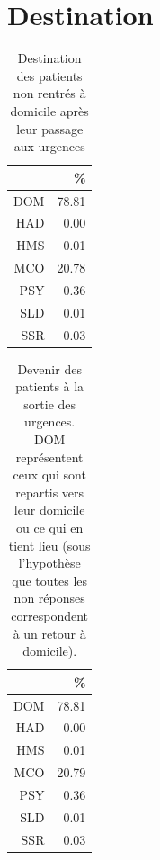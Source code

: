 \documentclass[12pt,english,french,twoside]{report}\usepackage[]{graphicx}\usepackage[]{color}
\begin{document}
\section{Destination}
\begin{table}[ht]
\centering
\begin{tabular}{rr}
  \hline
 & \% \\ 
  \hline
DOM & 78.81 \\ 
  HAD & 0.00 \\ 
  HMS & 0.01 \\ 
  MCO & 20.78 \\ 
  PSY & 0.36 \\ 
  SLD & 0.01 \\ 
  SSR & 0.03 \\ 
   \hline
\end{tabular}
\caption{Destination des patients non rentrés à domicile après leur passage aux urgences} 
\label{tab.dest.hosp}
\end{table}
\begin{table}[ht]
\centering
\begin{tabular}{rr}
  \hline
 & \% \\ 
  \hline
DOM & 78.81 \\ 
  HAD & 0.00 \\ 
  HMS & 0.01 \\ 
  MCO & 20.79 \\ 
  PSY & 0.36 \\ 
  SLD & 0.01 \\ 
  SSR & 0.03 \\ 
   \hline
\end{tabular}
\caption{Devenir des patients à la sortie des urgences. DOM représentent ceux qui sont repartis vers leur domicile ou ce qui en tient lieu (sous l'hypothèse que toutes les non réponses correspondent à un retour à domicile).} 
\label{tab.dest}
\end{table}
\end{document}
